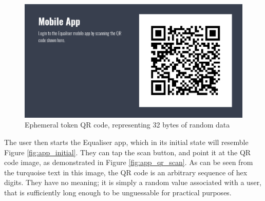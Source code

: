 \documentclass[12pt,a4paper]{bhamdissertation}
\begin{document}
\begin{figure}[!htbp]
    \centering
    \includegraphics[width=1\linewidth]{img/ephemeral_qr_code.png}
    \caption{Ephemeral token QR code, representing 32 bytes of random data}
    \label{fig:ephemeral_qr_code}
\end{figure}

The user then starts the Equaliser app, which in its initial state will resemble Figure \ref{fig:app_initial}. They can tap the scan button, and point it at the QR code image, as demonstrated in Figure \ref{fig:app_qr_scan}. As can be seen from the turquoise text in this image, the QR code is an arbitrary sequence of hex digits. They have no meaning; it is simply a random value associated with a user, that is sufficiently long enough to be unguessable for practical purposes.
\end{document}
